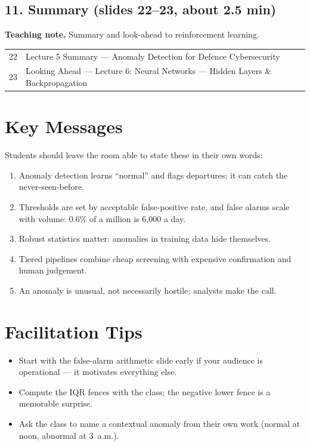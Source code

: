 \documentclass[11pt]{article}
\begin{document}
\subsection{11. Summary \normalfont\small\color{GreyN}(slides 22--23, about 2.5 min)}

\textbf{Teaching note.} Summary and look-ahead to reinforcement learning.

\begin{center}\small\renewcommand{\arraystretch}{1.1}\begin{tabularx}{\textwidth}{@{}r X@{}}22 & Lecture 5 Summary --- Anomaly Detection for Defence Cybersecurity\\
23 & Looking Ahead --- Lecture 6: Neural Networks --- Hidden Layers \& Backpropagation\\\end{tabularx}\end{center}

\section{Key Messages}Students should leave the room able to state these in their own words:\begin{keypoint}\begin{enumerate}\item Anomaly detection learns ``normal'' and flags departures; it can catch the never-seen-before.\item Thresholds are set by acceptable false-positive rate, and false alarms scale with volume: 0.6\% of a million is 6,000 a day.\item Robust statistics matter: anomalies in training data hide themselves.\item Tiered pipelines combine cheap screening with expensive confirmation and human judgement.\item An anomaly is unusual, not necessarily hostile; analysts make the call.\end{enumerate}\end{keypoint}

\section{Facilitation Tips}\begin{itemize}\item Start with the false-alarm arithmetic slide early if your audience is operational --- it motivates everything else.\item Compute the IQR fences with the class; the negative lower fence is a memorable surprise.\item Ask the class to name a contextual anomaly from their own work (normal at noon, abnormal at 3~a.m.).\end{itemize}
\end{document}
